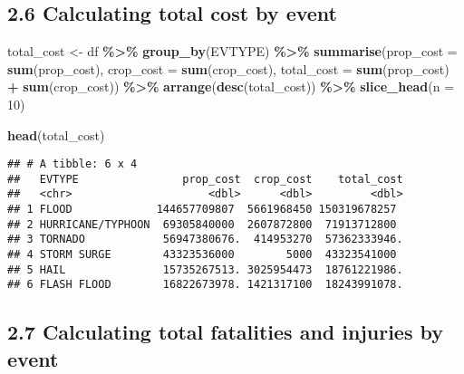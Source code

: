 \documentclass[
]{article}
\newenvironment{Shaded}{\begin{snugshade}}{\end{snugshade}}
\newcommand{\AttributeTok}[1]{\textcolor[rgb]{0.13,0.29,0.53}{#1}}
\newcommand{\DecValTok}[1]{\textcolor[rgb]{0.00,0.00,0.81}{#1}}
\newcommand{\FunctionTok}[1]{\textcolor[rgb]{0.13,0.29,0.53}{\textbf{#1}}}
\newcommand{\NormalTok}[1]{#1}
\newcommand{\OtherTok}[1]{\textcolor[rgb]{0.56,0.35,0.01}{#1}}
\newcommand{\SpecialCharTok}[1]{\textcolor[rgb]{0.81,0.36,0.00}{\textbf{#1}}}
\begin{document}
\hypertarget{calculating-total-cost-by-event}{%
\subsection{2.6 Calculating total cost by
event}\label{calculating-total-cost-by-event}}

\begin{Shaded}
\begin{Highlighting}[]
\NormalTok{total\_cost }\OtherTok{\textless{}{-}}\NormalTok{ df }\SpecialCharTok{\%\textgreater{}\%}
    \FunctionTok{group\_by}\NormalTok{(EVTYPE) }\SpecialCharTok{\%\textgreater{}\%}
    \FunctionTok{summarise}\NormalTok{(}\AttributeTok{prop\_cost =} \FunctionTok{sum}\NormalTok{(prop\_cost),}
              \AttributeTok{crop\_cost =} \FunctionTok{sum}\NormalTok{(crop\_cost),}
              \AttributeTok{total\_cost =} \FunctionTok{sum}\NormalTok{(prop\_cost) }\SpecialCharTok{+} \FunctionTok{sum}\NormalTok{(crop\_cost)) }\SpecialCharTok{\%\textgreater{}\%}
    \FunctionTok{arrange}\NormalTok{(}\FunctionTok{desc}\NormalTok{(total\_cost)) }\SpecialCharTok{\%\textgreater{}\%}
    \FunctionTok{slice\_head}\NormalTok{(}\AttributeTok{n =} \DecValTok{10}\NormalTok{)}

\FunctionTok{head}\NormalTok{(total\_cost)}
\end{Highlighting}
\end{Shaded}

\begin{verbatim}
## # A tibble: 6 x 4
##   EVTYPE                prop_cost  crop_cost    total_cost
##   <chr>                     <dbl>      <dbl>         <dbl>
## 1 FLOOD             144657709807  5661968450 150319678257 
## 2 HURRICANE/TYPHOON  69305840000  2607872800  71913712800 
## 3 TORNADO            56947380676.  414953270  57362333946.
## 4 STORM SURGE        43323536000        5000  43323541000 
## 5 HAIL               15735267513. 3025954473  18761221986.
## 6 FLASH FLOOD        16822673978. 1421317100  18243991078.
\end{verbatim}

\hypertarget{calculating-total-fatalities-and-injuries-by-event}{%
\subsection{2.7 Calculating total fatalities and injuries by
event}\label{calculating-total-fatalities-and-injuries-by-event}}
\end{document}
